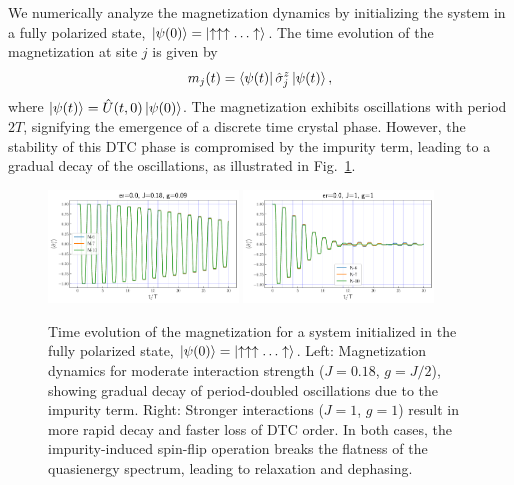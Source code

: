 \documentclass[a4paper,10pt]{article}
\begin{document}
We numerically analyze the magnetization dynamics by initializing the system in a fully polarized state, $\ket{\psi(0)} = \ket{\uparrow \uparrow \uparrow \ldots \uparrow}$. The time evolution of the magnetization at site $j$ is given by
\begin{align}
    m_j(t) = \bra{\psi(t)} \hat{\sigma}_j^z \ket{\psi(t)},
\end{align}
where $\ket{\psi(t)} = \hat{U}(t,0) \ket{\psi(0)}$. The magnetization exhibits oscillations with period $2T$, signifying the emergence of a discrete time crystal phase. However, the stability of this DTC phase is compromised by the impurity term, leading to a gradual decay of the oscillations, as illustrated in Fig.~\ref{figs:impure_flatband_dtc}.
\begin{figure}[h!]
    \centering
    \includegraphics[width=0.45\textwidth]{figs/mag_er0.0_J0.18_g0.09.pdf}
    \includegraphics[width=0.45\textwidth]{figs/mag_er0.0_J1_g1.pdf}
    \caption{Time evolution of the magnetization for a system initialized in the fully polarized state, $\ket{\psi(0)} = \ket{\uparrow \uparrow \uparrow \ldots \uparrow}$. Left: Magnetization dynamics for moderate interaction strength ($J=0.18$, $g=J/2$), showing gradual decay of period-doubled oscillations due to the impurity term. Right: Stronger interactions ($J=1$, $g=1$) result in more rapid decay and faster loss of DTC order. In both cases, the impurity-induced spin-flip operation breaks the flatness of the quasienergy spectrum, leading to relaxation and dephasing.}
    \label{figs:impure_flatband_dtc}
\end{figure}
\end{document}
